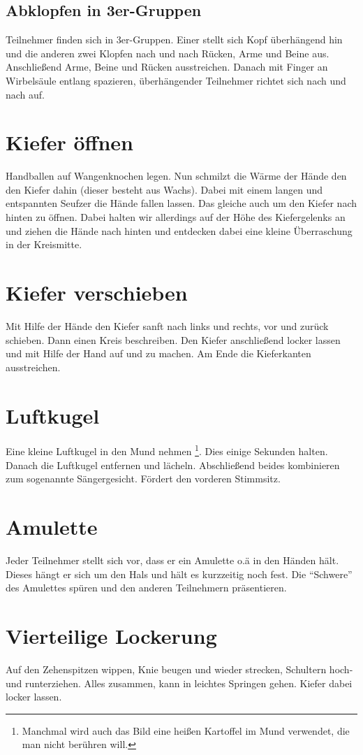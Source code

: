 \documentclass[ngerman, a4paper, twoside]{scrbook}%
\begin{document}
	 \subsection{Abklopfen in 3er-Gruppen}
	 Teilnehmer finden sich in 3er-Gruppen. Einer stellt sich Kopf überhängend hin und die anderen zwei Klopfen nach und nach Rücken, Arme und Beine aus. Anschließend Arme, Beine und Rücken ausstreichen. Danach mit Finger an Wirbelsäule entlang spazieren, überhängender Teilnehmer richtet sich nach und nach auf.
	 \section{Kiefer öffnen}
	 Handballen auf Wangenknochen legen. Nun schmilzt die Wärme der Hände den den Kiefer dahin (dieser besteht aus Wachs). Dabei mit einem langen und entspannten Seufzer die Hände fallen lassen. Das gleiche auch um den Kiefer nach hinten zu öffnen. Dabei halten wir allerdings auf der Höhe des Kiefergelenks an und ziehen die Hände nach hinten und entdecken dabei eine kleine Überraschung in der Kreismitte.
	 \section{Kiefer verschieben}
	 Mit Hilfe der Hände den Kiefer sanft nach links und rechts, vor und zurück schieben. Dann einen Kreis beschreiben. Den Kiefer anschließend locker lassen und mit Hilfe der Hand auf und zu machen.  Am Ende die Kieferkanten ausstreichen.
	 \section{Luftkugel}
	 Eine kleine Luftkugel in den Mund nehmen \footnote{Manchmal wird auch das Bild eine heißen Kartoffel im Mund verwendet, die man nicht berühren will.}. Dies einige Sekunden halten. Danach die Luftkugel entfernen und lächeln. Abschließend beides kombinieren zum sogenannte Sängergesicht. Fördert den vorderen Stimmsitz.
	 \section{Amulette}
	 Jeder Teilnehmer stellt sich vor, dass er ein Amulette o.ä in den Händen hält. Dieses hängt er sich um den Hals und hält es kurzzeitig noch fest. Die "`Schwere"' des Amulettes spüren und den anderen Teilnehmern präsentieren.
	 \section{Vierteilige Lockerung}
	 Auf den Zehenspitzen wippen, Knie beugen und wieder strecken, Schultern hoch- und runterziehen. Alles zusammen, kann in leichtes Springen gehen. Kiefer dabei locker lassen.
\end{document}
